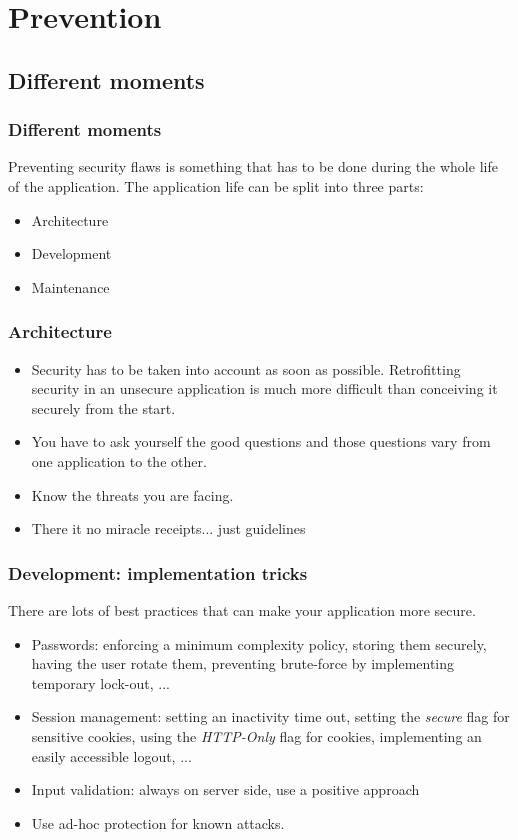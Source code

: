 \section{Prevention}

\subsection{Different moments}

\begin{frame}
\frametitle{Different moments}

Preventing security flaws is something that has to be done during the
whole life of the application. The application life can be split into
three parts:

\begin{itemize}
\item Architecture
\item Development
\item Maintenance
\end{itemize}
\end{frame}

\begin{frame}
\frametitle{Architecture}
\begin{itemize}
\item Security has to be taken into account as soon as
  possible. Retrofitting security in an unsecure application is much
  more difficult than conceiving it securely from the start.
\item You have to ask yourself the good questions and those questions
  vary from one application to the other.
\item Know the threats you are facing.
\item There it no miracle receipts... just guidelines
\end{itemize}
\end{frame}

\begin{frame}
\frametitle{Development: implementation tricks}

There are lots of best practices that can make your application more
secure.

\begin{itemize}
\item Passwords: enforcing a minimum complexity policy, storing them securely,
having the user rotate them, preventing brute-force by implementing temporary
lock-out, ...
\item Session management: setting an inactivity time out, setting the
\emph{secure} flag for sensitive cookies, using the \emph{HTTP-Only} flag for
cookies, implementing an easily accessible logout, ...
\item Input validation: always on server side, use a positive
  approach
\item Use ad-hoc protection for known attacks.
\end{itemize}
\end{frame}

